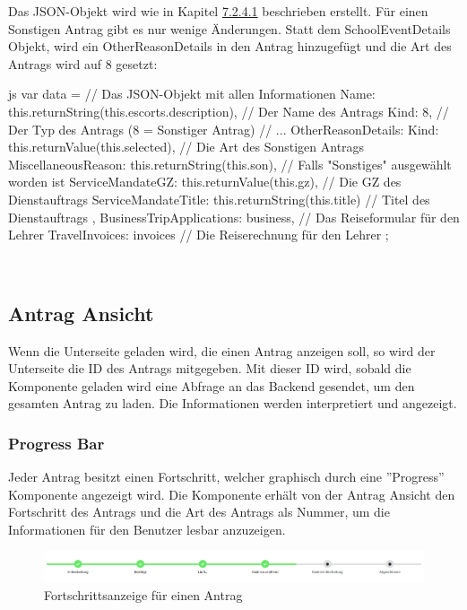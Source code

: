 Das JSON-Objekt wird wie in Kapitel \hyperref[code_submit_data]{7.2.4.1} beschrieben erstellt. Für einen Sonstigen Antrag gibt es nur wenige Änderungen.
Statt dem SchoolEventDetails Objekt, wird ein OtherReasonDetails in den Antrag hinzugefügt und die Art des Antrags wird auf 8 gesetzt:
\begin{code}{js}
var data = {		// Das JSON-Objekt mit allen Informationen
	Name: this.returnString(this.escorts.description),	// Der Name des Antrags
	Kind: 8,	// Der Typ des Antrags (8 = Sonstiger Antrag)
	// ...
	OtherReasonDetails: {
		Kind: this.returnValue(this.selected),	// Die Art des Sonstigen Antrags
		MiscellaneousReason: this.returnString(this.son),	// Falls "Sonstiges" ausgewählt worden ist
		ServiceMandateGZ: this.returnValue(this.gz),	// Die GZ des Dienstauftrags
		ServiceMandateTitle: this.returnString(this.title)	// Titel des Dienstauftrags
	},
	BusinessTripApplications: business,	// Das Reiseformular für den Lehrer
	TravelInvoices: invoices	// Die Reiserechnung für den Lehrer
};
\end{code}
~\\
\newpage
\subsection{Antrag Ansicht}
\label{sec:antrag_ansicht}
Wenn die Unterseite geladen wird, die einen Antrag anzeigen soll, so wird der Unterseite die ID des Antrags mitgegeben. Mit dieser ID wird, sobald die Komponente geladen wird eine Abfrage an das Backend gesendet, um den gesamten Antrag zu laden. Die Informationen werden interpretiert und angezeigt.
\subsubsection{Progress Bar}
Jeder Antrag besitzt einen Fortschritt, welcher graphisch durch eine ''Progress'' Komponente angezeigt wird. Die Komponente erhält von der  Antrag Ansicht den Fortschritt des Antrags und die Art des Antrags als Nummer, um die Informationen für den Benutzer lesbar anzuzeigen.
\begin{figure}
	\centering
	\includegraphics[width=1\linewidth]{images/progress}
	\caption[Fortschrittsanzeige]{Fortschrittsanzeige für einen Antrag}
	\label{fig:progress}
\end{figure}
